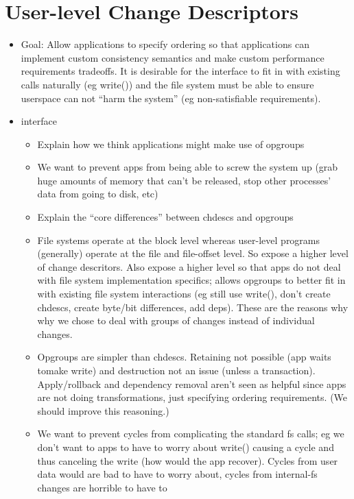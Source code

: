 \section{User-level Change Descriptors}
\label{opgroup}

\begin{itemize}
\item Goal: Allow applications to specify ordering so that
  applications can implement custom consistency semantics and make
  custom performance requirements tradeoffs. It is desirable for the
  interface to fit in with existing calls naturally (eg write()) and
  the file system must be able to ensure userspace can not ``harm the
  system'' (eg non-satisfiable requirements).
\item interface
  \begin{itemize}
  \item Explain how we think applications might make use of opgroups
  \item We want to prevent apps from being able to screw the system up
    (grab huge amounts of memory that can't be released, stop other
    processes' data from going to disk, etc)
  \item Explain the ``core differences'' between chdescs and
    opgroups
  \item File systems operate at the block level whereas user-level
    programs (generally) operate at the file and file-offset level.
    So expose a higher level of change descritors. Also expose a
    higher level so that apps do not deal with file system
    implementation specifics; allows opgroups to better fit in with
    existing file system interactions (eg still use write(), don't
    create chdescs, create byte/bit differences, add deps). These are
    the reasons why why we chose to deal with groups of changes
    instead of individual changes.
  \item Opgroups are simpler than chdescs. Retaining not possible (app
    waits tomake write) and destruction not an issue (unless a
    transaction). Apply/rollback and dependency removal aren't seen as
    helpful since apps are not doing transformations, just specifying
    ordering requirements. (We should improve this reasoning.)
  \item We want to prevent cycles from complicating the standard fs
    calls; eg we don't want to apps to have to worry about write()
    causing a cycle and thus canceling the write (how would the app
    recover). Cycles from user data would are bad to have to worry
    about, cycles from internal-fs changes are horrible to have to

\end{itemize}
\end{itemize}

